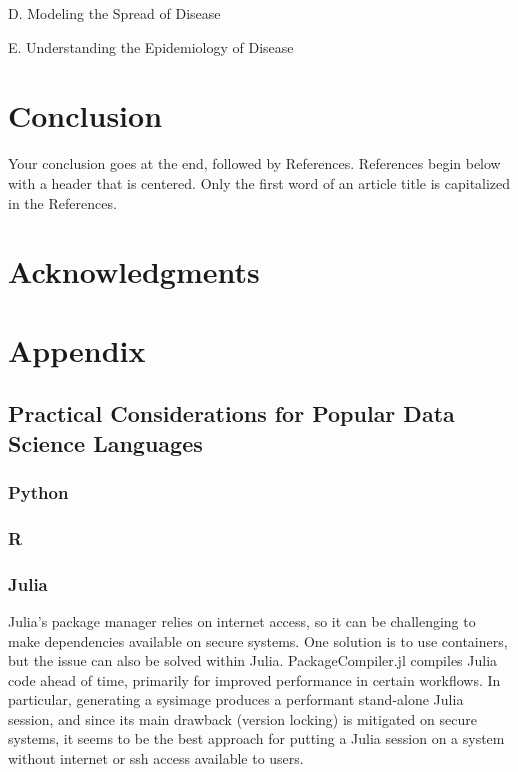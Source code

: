 \documentclass{amia}
\begin{document}
D. Modeling the Spread of Disease 

E. Understanding the Epidemiology of Disease 

\section*{Conclusion}

Your conclusion goes at the end, followed by References.  References begin below with a header that is centered.  Only the first word of an article title is capitalized in the References.

\section*{Acknowledgments}

\makeatletter
\renewcommand{\@biblabel}[1]{\hfill #1.}
\makeatother


  

\section*{Appendix}

\subsection*{Practical Considerations for Popular Data Science Languages}

\subsubsection*{Python}

\subsubsection*{R}

\subsubsection*{Julia}

Julia's package manager relies on internet access, so it can be challenging to make dependencies available on secure systems. One solution is to use containers, but the issue can also be solved within Julia. PackageCompiler.jl compiles Julia code ahead of time, primarily for improved performance in certain workflows. In particular, generating a sysimage produces a performant stand-alone Julia session, and since its main drawback (version locking) is mitigated on secure systems, it seems to be the best approach for putting a Julia session on a system without internet or ssh access available to users. 
\end{document}
